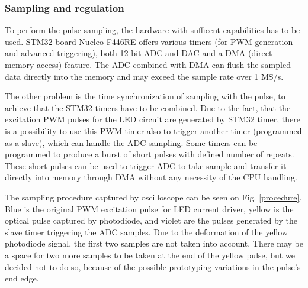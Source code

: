 \subsubsection{Sampling and regulation}

To perform the pulse sampling, the hardware with sufficent capabilities has to be used. STM32 board Nucleo F446RE \cite{NucF446RE} offers various timers (for PWM generation and advanced triggering), both 12-bit ADC and DAC and a DMA (direct memory access) feature. The ADC combined with DMA can flush the sampled data directly into the memory and may exceed the sample rate over 1 MS/s.

\par

The other problem is the time synchronization of sampling with the pulse, to achieve that the STM32 timers have to be combined. Due to the fact, that the excitation PWM pulses for the LED circuit are generated by STM32 timer, there is a possibility to use this PWM timer also to trigger another timer (programmed as a slave), which can handle the ADC sampling. Some timers can be programmed to produce a burst of short pulses with defined number of repeats. These short pulses can be used to trigger ADC to take sample and transfer it directly into memory through DMA without any necessity of the CPU handling.  
\par
The sampling procedure captured by oscilloscope can be seen on Fig. \ref{procedure}. Blue is the original PWM excitation pulse for LED current driver, yellow is the optical pulse captured by photodiode, and violet are the pulses generated by the slave timer triggering the ADC samples. Due to the deformation of the yellow photodiode signal, the first two samples are not taken into account. 
There may be a space for two more samples to be taken at the end of the yellow pulse, but we decided not to do so, because of the possible prototyping variations in the pulse's end edge. 


